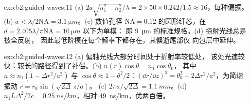 \begin{solution}{exo:b2:guided-waves:11}
(a) $2a\sqrt{n_1^2 - n_2^2}/\lambda = 2 \times 50 \times 0.242/1.5 \approx 16$，每种偏振。
(b) $a < \lambda/2\mathrm{NA} = \qty{3.1}{\micro m}$。(c) 数值孔径 $\mathrm{NA} =
0.12$ 的圆形纤芯，在 $d = 2.405\lambda/\pi\mathrm{NA} = \qty{10}{\micro m}$ 以下为单模：
即 \qty{9}{\micro m} 的标准规格。(d) 掠射光线总是被全反射，
因此最低阶模在每个频率下都存在，其倏逝尾部仅
向包层中延伸。
\end{solution}

\begin{solution}{exo:b2:guided-waves:12}
(a) 偏轴光线大部分时间处于折射率较低处，
该处光速较快：较长的路径得到了补偿。(b) $n(r)\cos\theta = n_1\cos\theta_0$，
其中 $n \approx n_1(1 - \Delta r^2/a^2)$ 与 $\cos\theta \approx 1 - \theta^2/2$：$(\dd r/\dd z)^2 =
\theta_0^2 - 2\Delta r^2/a^2$，为简谐振动 $r = r_0\sin(\sqrt{2\Delta}\,z/a)$。
(c) $2\pi a/\sqrt{2\Delta} = \qty{1.1}{mm}$。(d) $n_1L\Delta^2/2c = \qty{0.25}{ns/km}$，相对
\qty{49}{ns/km}，优两百倍。
\end{solution}

